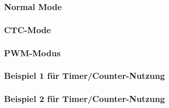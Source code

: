 {\subsubsection{Normal Mode}
\subsubsection{CTC-Mode}
\subsubsection{PWM-Modus}
\subsubsection{Beispiel 1 für Timer/Counter-Nutzung}
\subsubsection{Beispiel 2 für Timer/Counter-Nutzung}


}



